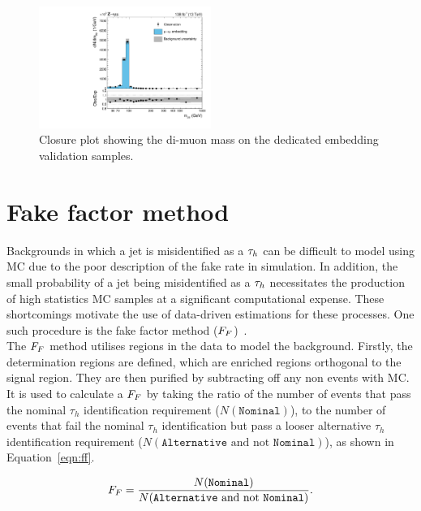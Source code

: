 \begin{figure}[!hbtp]
\centering
    \includegraphics[width=0.5\textwidth]{Figures/embedding_validation.pdf}
\caption[Plot of the validation of the embedding method.]{Closure plot showing the di-muon mass on the dedicated embedding validation samples.}
\label{fig:emb_validation}
\end{figure}

\section{Fake factor method}
\label{sec:ff}

Backgrounds in which a jet is misidentified as a $\tau_{h}$ can be difficult to model using \ac{MC} due to the poor description of the \jtth fake rate in simulation. 
In addition, the small probability of a jet being misidentified as a $\tau_{h}$ necessitates the production of high statistics \ac{MC} samples at a significant computational expense.
These shortcomings motivate the use of data-driven estimations for these processes. 
One such procedure is the fake factor method ($F_{F}$)~\cite{Sirunyan:2018zut,CMS:2018lkr}. \\

The $F_{F}$ method utilises regions in the data to model the \jtth background. 
Firstly, the determination regions are defined, which are \jtth enriched regions orthogonal to the signal region. 
They are then purified by subtracting off any non \jtth events with \ac{MC}.
It is used to calculate a $F_{F}$ by taking the ratio of the number of \jtth events that pass the nominal $\tau_h$ identification requirement ($N(\texttt{Nominal})$), to the number of \jtth events that fail the nominal $\tau_h$ identification but pass a looser alternative $\tau_h$ identification requirement ($N(\texttt{Alternative}\text{ and not }\texttt{Nominal})$), as shown in Equation~\ref{eqn:ff}.

\begin{equation}
F_{F} = \frac{N(\texttt{Nominal})}{N(\texttt{Alternative}\text{ and not }\texttt{Nominal})}.
\label{eqn:ff}
\end{equation}

